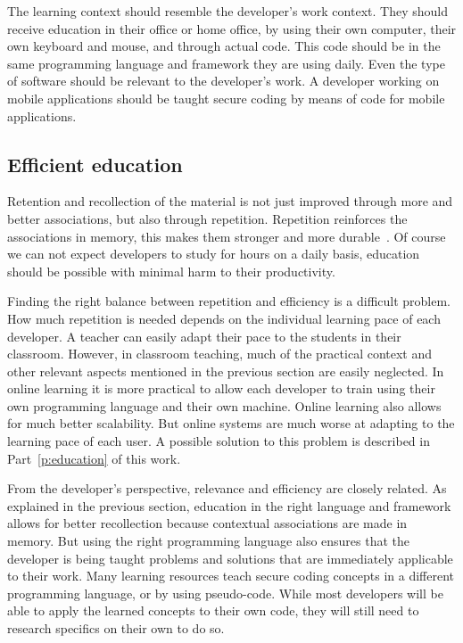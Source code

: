 The learning context should resemble the developer's work context. They should receive education in their office or home office, by using their own computer, their own keyboard and mouse, and through actual code. This code should be in the same programming language and framework they are using daily. Even the type of software should be relevant to the developer's work. A developer working on mobile applications should be taught secure coding by means of code for mobile applications.

\subsection{Efficient education}
Retention and recollection of the material is not just improved through more and better associations, but also through repetition. Repetition reinforces the associations in memory, this makes them stronger and more durable~\citep{dirksen2015design}.
Of course we can not expect developers to study for hours on a daily basis, education should be possible with minimal harm to their productivity.

Finding the right balance between repetition and efficiency is a difficult problem. How much repetition is needed depends on the individual learning pace of each developer. A teacher can easily adapt their pace to the students in their classroom.
However, in classroom teaching, much of the practical context and other relevant aspects mentioned in the previous section are easily neglected. In online learning it is more practical to allow each developer to train using their own programming language and their own machine. Online learning also allows for much better scalability. But online systems are much worse at adapting to the learning pace of each user. A possible solution to this problem is described in Part~\ref{p:education} of this work.

From the developer's perspective, relevance and efficiency are closely related.
As explained in the previous section, education in the right language and framework allows for better recollection because contextual associations are made in memory. But using the right programming language also ensures that the developer is being taught problems and solutions that are immediately applicable to their work.
Many learning resources teach secure coding concepts in a different programming language, or by using pseudo-code. While most developers will be able to apply the learned concepts to their own code, they will still need to research specifics on their own to do so.

